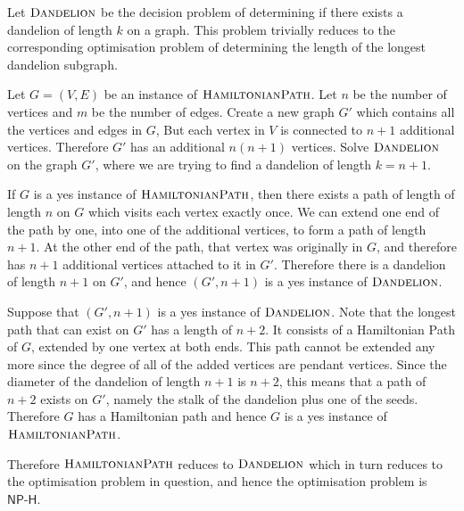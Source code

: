 \documentclass{article}
\begin{document}
\begin{solution}
Let $\mathsf{\textsc{Dandelion}}$ be the decision problem of determining if there exists 
a dandelion of length $k$ on a graph.
This problem trivially reduces to the corresponding optimisation problem 
of determining the length of the longest dandelion subgraph.

Let $G=(V,E)$ be an instance of $\mathsf{\textsc{HamiltonianPath}}$. Let $n$ be the number of vertices and 
$m$ be the number of edges.
Create a new graph $G'$ which contains all the vertices and edges in $G$,
But each vertex in $V$ is connected to $n + 1$ additional vertices.
Therefore $G'$ has an additional $n(n+1)$ vertices.
Solve $\mathsf{\textsc{Dandelion}}$ on the graph $G'$, where we are trying to find a dandelion 
of length $k = n + 1$. 

If $G$ is a yes instance of $\mathsf{\textsc{HamiltonianPath}}$, 
then there exists a path of length of length $n$ on $G$ which visits each vertex exactly once.
We can extend one end of the path by one, into one of the additional vertices,
to form a path of length $n + 1$. At the other end of the path, that vertex was originally in 
$G$, and therefore has $n+1$ additional vertices attached to it in $G'$.
Therefore there is a dandelion of length $n + 1$ on $G'$, and hence $(G', n+1)$ is 
a yes instance of $\mathsf{\textsc{Dandelion}}$.

Suppose that $(G', n+1)$ is a yes instance of $\mathsf{\textsc{Dandelion}}$.
Note that the longest path that can exist on $G'$ has a length of $n+2$.
It consists of a Hamiltonian Path of $G$, extended by one vertex at both ends.
This path cannot be extended any more since the degree of all of the added vertices are pendant vertices.
Since the diameter of the dandelion of length $n+1$ is $n+2$, 
this means that a path of $n+2$ exists on $G'$, namely the stalk of the dandelion plus one of the seeds.
Therefore $G$ has a Hamiltonian path and hence $G$ is a yes instance of $\mathsf{\textsc{HamiltonianPath}}$.

Therefore $\mathsf{\textsc{HamiltonianPath}}$ reduces to $\mathsf{\textsc{Dandelion}}$ 
which in turn reduces to the optimisation problem in question, and hence the optimisation 
problem is $\mathsf{NP\text{-}H}$.


\end{solution}
\end{document}
